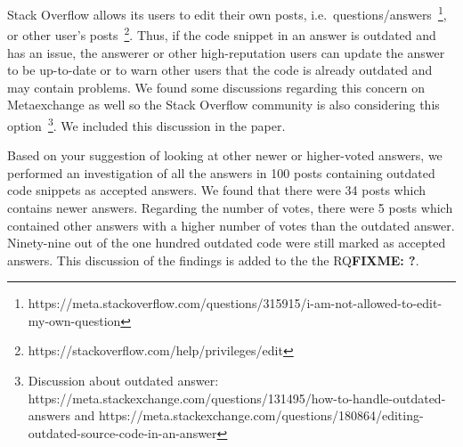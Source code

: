 \documentclass[a4paper,twoside,10pt]{reviewresponse}
\newcommand\FIXME[1]{{\color{red}\textbf{FIXME: #1}}}
\begin{document}

Stack Overflow allows its users to edit their own posts, i.e.~questions/answers~\footnote{https://meta.stackoverflow.com/questions/315915/i-am-not-allowed-to-edit-my-own-question}, or other user's posts~\footnote{https://stackoverflow.com/help/privileges/edit}. Thus, if the code snippet in an answer is outdated and has an issue, the answerer or other high-reputation users can update the answer to be up-to-date or to warn other users that the code is already outdated and may contain problems. We found some discussions regarding this concern on Metaexchange as well so the Stack Overflow community is also considering this option~\footnote{Discussion about outdated answer: https://meta.stackexchange.com/questions/131495/how-to-handle-outdated-answers and https://meta.stackexchange.com/questions/180864/editing-outdated-source-code-in-an-answer}. We included this discussion in the paper.

Based on your suggestion of looking at other newer or higher-voted answers, we performed an investigation of all the answers in 100 posts containing outdated code snippets as accepted answers. We found that there were 34 posts which contains newer answers. Regarding the number of votes, there were 5 posts which contained other answers with a higher number of votes than the outdated answer. Ninety-nine out of the one hundred outdated code were still marked as accepted answers. 
This discussion of the findings is added to the the RQ\FIXME{?}.
		
\end{document}
